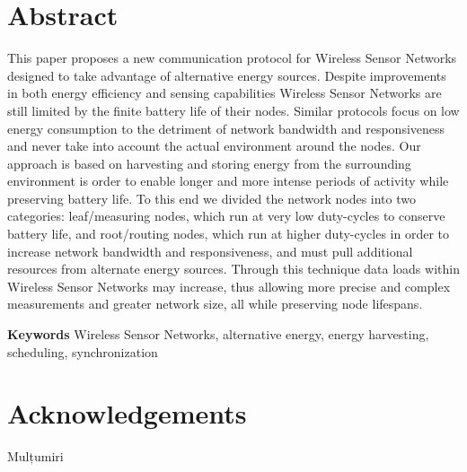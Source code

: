 \chapter*{Abstract}

This paper proposes a new communication protocol for Wireless Sensor Networks
designed to take advantage of alternative energy sources. Despite improvements
in both energy efficiency and sensing capabilities Wireless Sensor Networks are
still limited by the finite battery life of their nodes. Similar 
protocols focus on low energy consumption to the detriment of network bandwidth and 
responsiveness and never take into account the actual environment around the
nodes. Our approach is based on harvesting and storing energy
from the surrounding environment is order to enable longer and more
intense periods of activity while preserving battery life. To this end we divided the
network nodes into two categories: leaf/measuring nodes, which run at very low
duty-cycles to conserve battery life, and root/routing nodes, which run at
higher duty-cycles in order to increase network bandwidth and responsiveness,
and must pull additional resources from alternate energy sources. Through this
technique data loads within Wireless Sensor Networks may increase, thus allowing
more precise and complex measurements and greater network size, all while
preserving node lifespans.

\vspace{\baselineskip}
\textbf{Keywords} Wireless Sensor Networks, alternative energy, energy
harvesting, scheduling, synchronization

\chapter*{Acknowledgements}

Mulțumiri 



